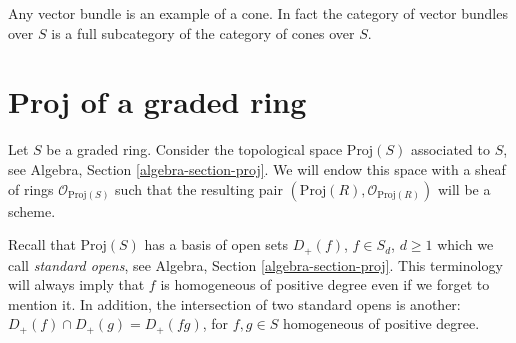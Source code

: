 \noindent
Any vector bundle is an example of a cone. In fact the category of
vector bundles over $S$ is a full subcategory of the category of cones
over $S$.










\section{Proj of a graded ring}
\label{section-proj}

\noindent
Let $S$ be a graded ring. Consider the topological space $\text{Proj}(S)$
associated to $S$, see Algebra, Section \ref{algebra-section-proj}.
We will endow this space with a sheaf of rings $\mathcal{O}_{\text{Proj}(S)}$
such that the resulting pair $(\text{Proj}(R), \mathcal{O}_{\text{Proj}(R)})$
will be a scheme.

\medskip\noindent
Recall that $\text{Proj}(S)$ has a basis of open sets $D_{+}(f)$,
$f \in S_d$, $d \geq 1$ which we call {\it standard opens}, see Algebra,
Section \ref{algebra-section-proj}. This terminology will always
imply that $f$ is homogeneous of positive degree even if we forget to
mention it. In addition, the intersection of two standard opens is another:
$D_{+}(f) \cap D_{+}(g) = D_{+}(fg)$, for $f, g \in S$ homogeneous of positive
degree.


